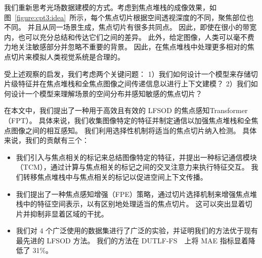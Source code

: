 %
%
%
%
我们重新思考光场数据建模的方式。考虑到焦点堆栈的成像效果，如图~\ref{figure:cpt3:idea}~所示，每个焦点切片根据空间透视深度的不同，聚焦部位也不同。 并且从同一场景生成，焦点切片有很多共同点。
因此，即使在很小的带宽内，也可以充分总结和传达它们之间的差异。 此外，给定图像，人类可以毫不费力地关注敏感部分并忽略不重要的背景。 因此，在焦点堆栈中处理更多相对的焦点切片来模拟人类视觉系统是合理的。 
%
%
%
%
\par
%
%

受上述观察的启发，我们考虑两个关键问题：
%
%
%
%
1）我们如何设计一个模型来存储切片级特征并在焦点堆栈和全焦点图像之间传递信息以进行上下文建模？ 
2）我们如何设计一个模型来理解场景的空间分布并感知敏感的焦点切片？ 
%
%
%
%
\par
在本文中，我们提出了一种用于高效且有效的 LFSOD 的焦点感知Transformer（FPT）。 具体来说，我们收集图像特定的特征并制定通信以加强焦点堆栈和全焦点图像之间的相互感知。 我们利用选择性机制将适当的焦点切片纳入检测。 具体来说，我们的贡献有三个：
%
%
%
%
\par
%
%
%
%
\begin{itemize}
	\item 我们引入与焦点相关的标记来总结图像特定的特征，并提出一种标记通信模块（TCM），通过计算与焦点相关的标记之间的交叉注意力来执行特征交互。 我们转移焦点堆栈中与焦点相关的标记以促进空间上下文传播。 
	
	\item 我们提出了一种焦点感知增强（FPE）策略，通过切片选择机制来增强焦点堆栈中的特征空间表示，以有区别地处理适当的焦点切片。	这可以突出显着切片并抑制非显着区域的干扰。 
	
	\item 我们对 4 个广泛使用的数据集进行了广泛的实验，并证明我们的方法优于现有最先进的 LFSOD 方法。 我们的方法在 DUTLF-FS~\cite{zhang2019memory}~上将 MAE 指标显着降低了 31\%。
\end{itemize}


